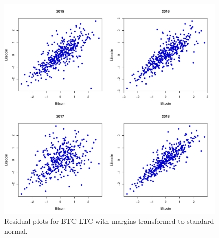 \begin{figure}[H]
	\centering
 \includegraphics[width = 110mm]{img/BTC_LTC_Residuals.pdf}
	\caption{Residual plots for BTC-LTC with margins transformed to standard normal.}
	\label{Residual_BTC_LTC}
\end{figure}

